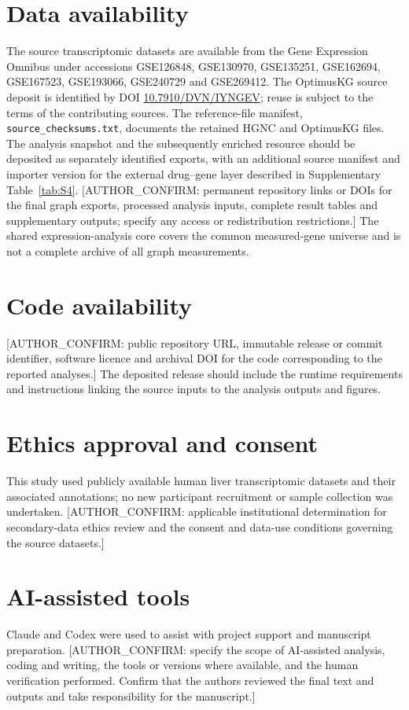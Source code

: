 \documentclass[11pt,a4paper]{article}
\begin{document}
\section*{Data availability}
The source transcriptomic datasets are available from the Gene Expression Omnibus under accessions GSE126848, GSE130970, GSE135251, GSE162694, GSE167523, GSE193066, GSE240729 and GSE269412. The OptimusKG source deposit is identified by DOI \href{https://doi.org/10.7910/DVN/IYNGEV}{10.7910/DVN/IYNGEV}; reuse is subject to the terms of the contributing sources. The reference-file manifest, \nolinkurl{source_checksums.txt}, documents the retained HGNC and OptimusKG files. The analysis snapshot and the subsequently enriched resource should be deposited as separately identified exports, with an additional source manifest and importer version for the external drug--gene layer described in Supplementary Table~\ref{tab:S4}. [AUTHOR\_CONFIRM: permanent repository links or DOIs for the final graph exports, processed analysis inputs, complete result tables and supplementary outputs; specify any access or redistribution restrictions.] The shared expression-analysis core covers the common measured-gene universe and is not a complete archive of all graph measurements.

\section*{Code availability}
[AUTHOR\_CONFIRM: public repository URL, immutable release or commit identifier, software licence and archival DOI for the code corresponding to the reported analyses.] The deposited release should include the runtime requirements and instructions linking the source inputs to the analysis outputs and figures.

\section*{Ethics approval and consent}
This study used publicly available human liver transcriptomic datasets and their associated annotations; no new participant recruitment or sample collection was undertaken. [AUTHOR\_CONFIRM: applicable institutional determination for secondary-data ethics review and the consent and data-use conditions governing the source datasets.]

\section*{AI-assisted tools}
Claude and Codex were used to assist with project support and manuscript preparation. [AUTHOR\_CONFIRM: specify the scope of AI-assisted analysis, coding and writing, the tools or versions where available, and the human verification performed. Confirm that the authors reviewed the final text and outputs and take responsibility for the manuscript.]
\end{document}
